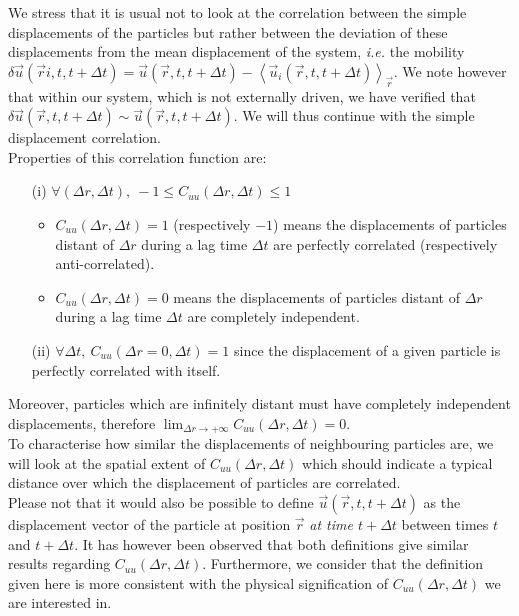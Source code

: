 \documentclass[class=report, float=false, crop=false]{standalone}
\begin{document}
We stress that it is usual not to look at the correlation between the simple displacements of the particles but rather between the deviation of these displacements from the mean displacement of the system, \textit{i.e.} the mobility $\delta\vec{u}(\vec{r}i, t, t + \Delta t) = \vec{u}(\vec{r}, t, t + \Delta t) - \left<\vec{u}_i(\vec{r}, t, t + \Delta t)\right>_{\vec{r}}$. We note however that within our system, which is not externally driven, we have verified that $\delta\vec{u}(\vec{r}, t, t + \Delta t) \sim \vec{u}(\vec{r}, t, t + \Delta t)$. We will thus continue with the simple displacement correlation.\\

Properties of this correlation function are:
\begin{enumerate}
  \item[(i)] $\forall (\Delta r, \Delta t),~ -1 \leq C_{uu}(\Delta r, \Delta t) \leq 1$
  \begin{itemize}
    \item $C_{uu}(\Delta r, \Delta t) = 1$ (respectively $-1$) means the displacements of particles distant of $\Delta r$ during a lag time $\Delta t$ are perfectly correlated (respectively anti-correlated).
    \item $C_{uu}(\Delta r, \Delta t) = 0$ means the displacements of particles distant of $\Delta r$ during a lag time $\Delta t$ are completely independent.
  \end{itemize}
  \item[(ii)] $\forall \Delta t,~ C_{uu}(\Delta r = 0, \Delta t) = 1$ since the displacement of a given particle is perfectly correlated with itself.
\end{enumerate}
Moreover, particles which are infinitely distant must have completely independent displacements, therefore $\lim_{\Delta r \rightarrow + \infty} C_{uu}(\Delta r, \Delta t) = 0$.\\

To characterise how similar the displacements of neighbouring particles are, we will look at the spatial extent of $C_{uu}(\Delta r, \Delta t)$ which should indicate a typical distance over which the displacement of particles are correlated.\\

Please not that it would also be possible to define $\vec{u}(\vec{r}, t, t + \Delta t)$ as the displacement vector of the particle at position $\vec{r}$ \textit{at time $t + \Delta t$} between times $t$ and $t + \Delta t$. It has however been observed that both definitions give similar results regarding $C_{uu}(\Delta r, \Delta t)$. Furthermore, we consider that the definition given here is more consistent with the physical signification of $C_{uu}(\Delta r, \Delta t)$ we are interested in.
\end{document}
